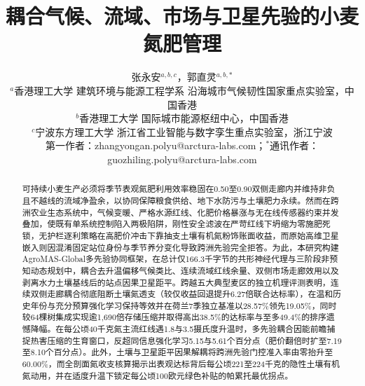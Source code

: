 \documentclass[11pt,a4paper]{article}
\begin{document}
\renewcommand{\abstractname}{摘要}\renewcommand{\tablename}{表}\renewcommand{\figurename}{图}\renewcommand{\refname}{参考文献}\renewcommand{\appendixname}{附录}

\title{耦合气候、流域、市场与卫星先验的小麦氮肥管理}

\author{张永安$^{a,b,c}$，郭直灵$^{a,b,*}$\\\footnotesize $^{a}$香港理工大学 建筑环境与能源工程学系 沿海城市气候韧性国家重点实验室，中国香港\\\footnotesize $^{b}$香港理工大学 国际城市能源枢纽中心，中国香港\\\footnotesize $^{c}$宁波东方理工大学 浙江省工业智能与数字孪生重点实验室，浙江宁波\\\footnotesize 第一作者：zhangyongan.polyu@arctura-labs.com；$^{*}$通讯作者：guozhiling.polyu@arctura-labs.com}

\date{}

\maketitle

\begin{abstract}

可持续小麦生产必须将季节表观氮肥利用效率稳固在0.50至0.90双侧走廊内并维持非负且不越线的流域净盈余，以协同保障粮食供给、地下水防污与土壤肥力永续。然而在跨洲农业生态系统中，气候变暖、严格水源红线、化肥价格暴涨与无在线传感器约束并发叠加，使既有单系统控制陷入两极陷阱，刚性安全滤波在严苛红线下坍缩为零施肥死锁，无护栏逐利策略在高肥价冲击下靠抽支土壤有机氮粉饰账面收益，而原始高维卫星嵌入则因混淆固定站位身份与季节养分变化导致跨洲先验完全拒答。为此，本研究构建AgroMAS-Global多先验协同框架，在总计仅166.3千字节的共形神经代理与三阶段非预知动态规划中，耦合去升温偏移气候类比、连续流域红线余量、双侧市场走廊效用以及剥离水力土壤基线后的站点因果卫星距平。跨越五大典型麦区的独立机理评测表明，连续双侧走廊耦合彻底阻断土壤氮透支（较仅收益回退提升6.27倍联合达标率），在温和历史年份与充分预算强化学习保持等效并在荷兰7季独立基准以28.57\%领先19.05\%，同时较64棵树集成实现逾1,690倍存储压缩并取得高出38.5\%的达标率与至多49.4\%的排序遗憾降幅。在每公顷40千克氮主流红线遇1.8与3.5摄氏度升温时，多先验耦合因能前瞻捕捉热害压缩的生育窗口，反超同信息强化学习5.15与5.61个百分点（肥价翻倍时扩至7.19至8.10个百分点）。此外，土壤与卫星距平因果解耦将跨洲先验门控准入率由零抬升至60.00\%，而全剖面氮收支核算揭示出表观达标背后每公顷221至224千克的隐性土壤有机氮动用，并在适度升温下锁定每公顷100欧元绿色补贴的帕累托最优拐点。

\end{abstract}
\end{document}
